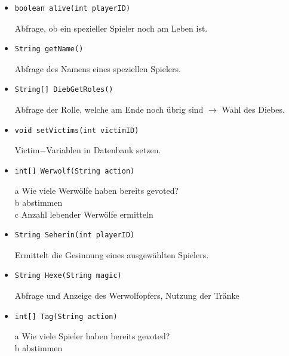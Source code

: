 \documentclass[12pt, a4paper]{article}
\begin{document}
\begin{itemize}
\item \begin{verbatim}
boolean alive(int playerID)
\end{verbatim}
\vspace{-0.2 cm}
Abfrage, ob ein spezieller Spieler noch am Leben ist.

\item \begin{verbatim}
String getName()
\end{verbatim}
\vspace{-0.2 cm}
Abfrage des Namens eines speziellen Spielers.

\item \begin{verbatim}
String[] DiebGetRoles()
\end{verbatim}
\vspace{-0.2 cm}
Abfrage der Rolle, welche am Ende noch übrig sind $\rightarrow$ Wahl des Diebes.

\item \begin{verbatim}
void setVictims(int victimID)
\end{verbatim}
\vspace{-0.2 cm}
Victim$-$Variablen in Datenbank setzen.

\item \begin{verbatim}
int[] Werwolf(String action)
\end{verbatim}
\vspace{-0.2 cm}
a  Wie viele Werwölfe haben bereits gevoted?  \\
b  abstimmen \\
c  Anzahl lebender Werwölfe ermitteln

\item \begin{verbatim}
String Seherin(int playerID)
\end{verbatim}
\vspace{-0.2 cm}
Ermittelt die Gesinnung eines ausgewählten Spielers.

\item \begin{verbatim}
String Hexe(String magic)
\end{verbatim}
\vspace{-0.2 cm}
Abfrage und Anzeige des Werwolfopfers, Nutzung der Tränke

\item \begin{verbatim}
int[] Tag(String action)
\end{verbatim}
\vspace{-0.2 cm}
a  Wie viele Spieler haben bereits gevoted? \\
b  abstimmen


\end{itemize}
\end{document}
